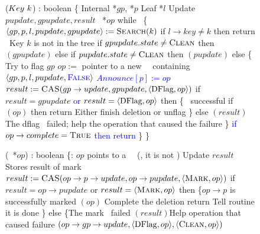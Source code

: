 \begin{figure*}
	\scriptsize
	\begin{code}
		\firstline
		($Key\ k$) : boolean \{\nlc
		\n Internal *$gp$, *$p$\nlc
		Leaf *$l$\nlc
		Update $pupdate, gpupdate, result$\nlc
		\DFlag\ *$op$\bl\nlc
		while \TRUE\ \{ \nlc
		\n     $\langle gp, p, l, pupdate, gpupdate \rangle := \mbox{\sc Search}(k)$\label{del-search}\nlc
		if $l\rightarrow key \neq k$ then return \FALSE\ \tabtabcom Key $k$ is not in the tree\label{delete-false}\nlc
		if $gpupdate.state \neq \mbox{\sc Clean}$ then $(gpupdate)$ \label{del-help-unclean-1}\nlc
		else if $pupdate.state \neq \mbox{\sc Clean}$ then $(pupdate)$\label{del-help-unclean-2}\nlc
		else \{ \tabtabcom Try to flag $gp$\nlc
		\n          $op :=$ pointer to a new \DFlag\ \record\  containing $\langle gp, p, l, pupdate, \textcolor{blue}{\mbox{\sc False}} \rangle$\label{new-DFlag}\nlc
		\textcolor{blue}{$Announce[p] := op$} \nlc
		$result := \mbox{\sc CAS}(gp\rightarrow update, gpupdate, \langle \mbox{DFlag}, op \rangle)$ \label{dflag-cas}\nlc
		if $result = gpupdate$ \textcolor{blue}{ or $result = \langle \mbox{DFlag}, op \rangle$} then \{ \tabtabcom \CASB\ successful \nlc
		\n             if $(op)$ then return \TRUE \label{delete-true} \tabtabcom Either finish deletion or unflag\nlc
		\p          \}\nlc                 
		else $(result)$ \tabcom The dflag \CASB\ failed; help the operation that caused the failure \label{del-help-after-failure}\nlc%
		\p     \}\nlc
		\textcolor{blue}{if $op \rightarrow complete = \mbox{\sc True}$ then} \nlc
		\n		\textcolor{blue}{return \TRUE} \nlc \p
		\p \}\nlc
		\p
		\}\bl
		\nlc
		
		(\DFlag\ *$op$) : boolean \{\ul
		\n   {}:  $op$ points to a \DFlag\ \record\  (\ie, it is not \NULL)\nlc%
		Update $result$ \tabtabcom Stores result of mark \CASB\bl\nlc
		$result := \mbox{\sc CAS}(op\rightarrow p\rightarrow update, op\rightarrow pupdate, \langle \mbox{\sc Mark}, op\rangle)$ \label{mark-cas}\nlc     
		if $result = op\rightarrow pupdate$ or $result = \langle \mbox{\sc Mark}, op\rangle$ then \label{checkmark}\{\tabtabcom $op\rightarrow p$ is successfully marked\nlc
		\n          {}$(op)$ \label{call-hm1} \tabtabcom Complete the deletion\nlc
		return \TRUE\tabtabcom Tell  routine it is done\nlc
		\p       \}\nlc
		else \{\tabtabcom The mark \CASB\ failed \nlc
		\n              
		$(result)$\label{help-after-failed-mark}\tabtabcom Help operation that caused failure\nlc
		\CASB$(op\rightarrow gp\rightarrow update, \langle \mbox{DFlag}, op\rangle, \langle \mbox{\sc Clean}, op\rangle)$ \label{backtrack-cas}\nlc
		

\end{code}
\end{figure*}
